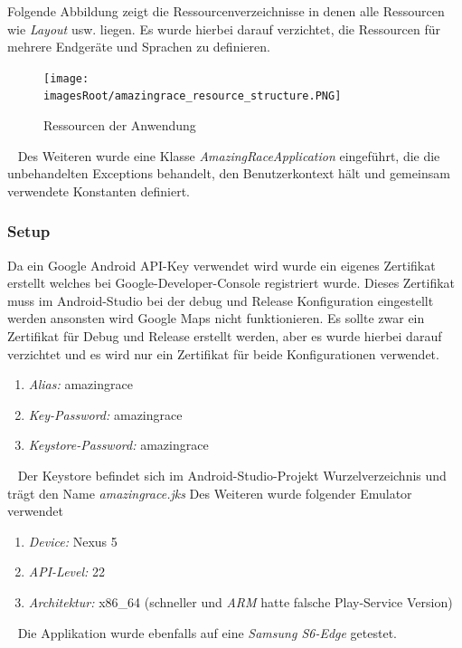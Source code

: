 \documentclass[11pt, a4paper, twoside]{article}   	%
\newcommand{\imagesRoot}{images}
\begin{document}
Folgende Abbildung zeigt die Ressourcenverzeichnisse in denen alle Ressourcen wie \emph{Layout} usw. liegen. Es wurde hierbei darauf verzichtet, die Ressourcen für mehrere Endgeräte und Sprachen zu definieren.
\begin{figure}[h]
	\centering
	\texttt{[image: \\imagesRoot/amazingrace\_resource\_structure.PNG]}
	\caption
	{Ressourcen der Anwendung}
\end{figure}
\ \newline
Des Weiteren wurde eine Klasse \emph{AmazingRaceApplication} eingeführt, die die unbehandelten Exceptions behandelt, den Benutzerkontext hält und gemeinsam verwendete Konstanten definiert.
\newline
\subsubsection{Setup}
Da ein Google Android API-Key verwendet wird wurde ein eigenes Zertifikat erstellt welches bei Google-Developer-Console registriert wurde. Dieses Zertifikat muss im Android-Studio bei der debug und Release Konfiguration eingestellt werden ansonsten wird Google Maps nicht funktionieren. Es sollte zwar ein Zertifikat für Debug und Release erstellt werden, aber es wurde hierbei darauf verzichtet und es wird nur ein Zertifikat für beide Konfigurationen verwendet.
\begin{enumerate}
	\item\emph{Alias:} amazingrace
	\item\emph{Key-Password:} amazingrace
	\item\emph{Keystore-Password:} amazingrace
\end{enumerate}
\ \newline
Der Keystore befindet sich im Android-Studio-Projekt Wurzelverzeichnis und trägt den Name \emph{amazingrace.jks}
\newline
\newline
Des Weiteren wurde folgender Emulator verwendet
\begin{enumerate}
	\item\emph{Device:} Nexus 5
	\item\emph{API-Level:} 22
	\item\emph{Architektur:} x86\_64 (schneller und \emph{ARM}  hatte falsche Play-Service Version)
\end{enumerate}
\ \newline
Die Applikation wurde ebenfalls auf eine \emph{Samsung S6-Edge} getestet.
\newpage
\end{document}
